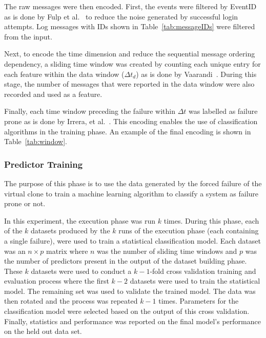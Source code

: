 \tabMessage

The raw messages were then encoded.  First, the events were filtered by EventID
as is done by Fulp et al.~\cite{fulp2008} to reduce the noise generated by
successful login attempts.  Log messages with IDs shown in
Table~\ref{tab:messageIDs} were filtered from the input.  

Next, to encode the time dimension and reduce the sequential message ordering
dependency, a sliding time window was created by counting each unique entry for
each feature within the data window ($\Delta t_d$) as is done by
Vaarandi~\cite{vaarandi2002}.  During this stage, the number of messages that
were reported in the data window were also recorded and used as a feature.

Finally, each time window preceding the failure within $\Delta t$ was labelled
as failure prone as is done by Irrera, et al.~\cite{irrera2015}.  This encoding
enables the use of classification algorithms in the training phase.  An example
of the final encoding is shown in Table~\ref{tab:window}.

\tabMessageIDs %
\tabSlidingWindow

\subsubsection{Predictor Training} \label{sec:predictor.training}
The purpose of this phase is to use the data generated by the forced failure of
the virtual clone to train a machine learning algorithm to classify a system as
failure prone or not.  

In this experiment, the execution phase was run $k$ times.  During this phase,
each of the $k$ datasets produced by the $k$ runs of the execution phase (each
containing a single failure), were used to train a statistical classification
model.  Each dataset was an $n \times p$ matrix where $n$ was the number of
sliding time windows and $p$ was the number of predictors present in the output
of the dataset building phase.  These $k$ datasets were used to conduct a $k -
1$-fold cross validation training and evaluation process where the first $k -
2$ datasets were used to train the statistical model.  The remaining set was
used to validate the trained model.  The data was then rotated and the process
was repeated $k - 1$ times.  Parameters for the classification model were
selected based on the output of this cross validation.  Finally, statistics and
performance was reported on the final model's performance on the held out data
set.

